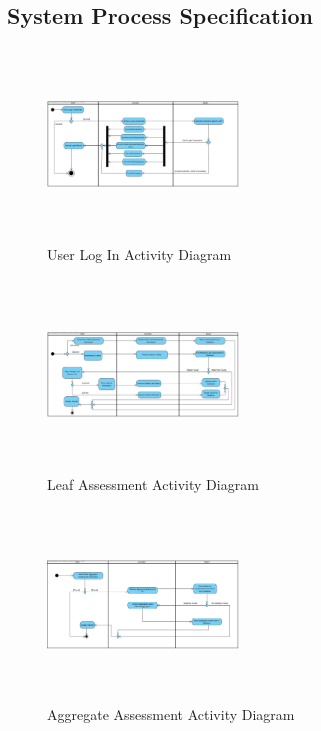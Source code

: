 \documentclass[12pt]{article}
\begin{document}
				\vspace{0.2in}
		
		\subsection{System Process Specification}%
						\begin{figure}[h]
										\centering
										\includegraphics[width=2in, height=2in]{Pictures/LoginActivityDiagram.jpg}
										\caption{User Log In Activity Diagram}
						\end{figure}
						\begin{figure}[h]
										\centering
										\includegraphics[width=2in, height=2in]{Pictures/LeafAssesmentActivityDiagram.jpg}
										\caption{Leaf Assessment Activity Diagram}
						\end{figure}
						\begin{figure}[h]
										\centering
										\includegraphics[width=2in, height=2in]{Pictures/AggregateAssesmentActivityDiagram.jpg}
										\caption{Aggregate Assessment Activity Diagram}
						\end{figure}
\end{document}
